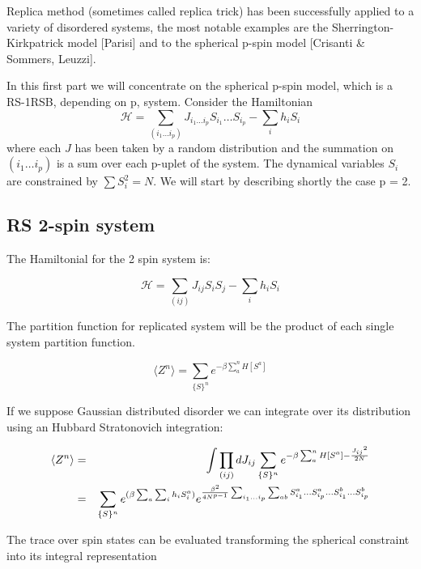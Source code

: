 \documentclass{article}
\begin{document}
  Replica method (sometimes called replica trick) has been successfully
  applied to a variety of disordered systems, the most notable examples are
  the Sherrington-Kirkpatrick model [Parisi] and to the spherical p-spin model
  [Crisanti & Sommers, Leuzzi].

In this first part we will concentrate on the spherical p-spin model, which is
a RS-1RSB, depending on p, system. Consider the Hamiltonian
\begin{equation}
  \mathcal{H} = \sum_{(i_1 \ldots i_p)} J_{i_1 \ldots i_p} S_{i_1} \ldots
  S_{i_p} - \sum_i h_i S_i
\end{equation}
where each $J$ has been taken by a random distribution and the summation on
$(i_1 \ldots i_p)$ is a sum over each p-uplet of the system.  
The dynamical variables $S_i$ are constrained by $\sum S_i^2 = N$. We will start by describing
shortly the case p = 2.

\subsection{RS 2-spin system}

The Hamiltonial for the 2 spin system is: 

\begin{equation}
  \mathcal{H} = \sum_{(ij)} J_{ij} S_i S_j - \sum_i h_i S_i
\end{equation}

The partition function for replicated system will be the product of each single system partition function.

\begin{equation}
  \langle Z^n \rangle = \sum_{\{S\}^n} e^{- \beta \sum_a^n H [S^a]}
\end{equation}

If we suppose Gaussian distributed disorder we can integrate over its distribution using an Hubbard Stratonovich integration: 

\begin{eqnarray}
  \langle Z^n \rangle &=& \int \prod_{(ij)} d J_{ij} \sum_{\{S\}^n} e^{- \beta \sum_a^n H [S^a] - {{J_{ij}}^2\over {2N}} } \\  
&=&  \sum_{\{S\}^n} e^{(\beta \sum_a \sum_i h_i S_i ^a)} e^{   {   {\beta^2}       \over    {4N^{p-1} }   }  \sum_{i_1\dots i_p}  \sum_{ab} S_{i_1}^a\dots S_{i_p}^a \dots S_{i_1}^b \dots S_{i_p}^b                    }
\end{eqnarray}

The trace over spin states can be evaluated transforming the spherical constraint into its integral representation
\end{document}
